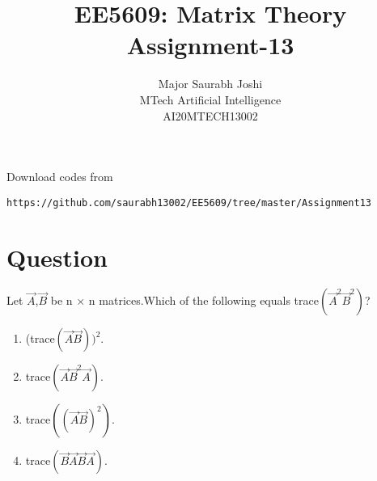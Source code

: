\documentclass[journal,12pt,onecolumn]{IEEEtran}
\begin{document}
     \def\rightbox#1{\makebox[0in][r]{#1}}
     \def\centbox#1{\makebox[0in]{#1}}
     \def\topbox#1{\raisebox{-\baselineskip}[0in][0in]{#1}}
     \def\midbox#1{\raisebox{-0.5\baselineskip}[0in][0in]{#1}}
\vspace{3cm}
\onecolumn
\title{EE5609: Matrix Theory\\
          Assignment-13\\}
\author{Major Saurabh Joshi\\MTech Artificial Intelligence\\AI20MTECH13002 }
\maketitle
\bigskip
\renewcommand{\thefigure}{\theenumi}
\renewcommand{\thetable}{\theenumi}
Download codes from 
%
\begin{lstlisting}
https://github.com/saurabh13002/EE5609/tree/master/Assignment13
\end{lstlisting}
%
 
\section{Question}
Let $\vec{A}$,$\vec{B}$ be n × n matrices.Which of the following equals trace$(\vec{A}^2 \vec{B}^2)$?\\

\begin{enumerate}
\item (trace$(\vec{A} \vec{B}))^2.$
\item trace$(\vec{A} \vec{B}^2 \vec{A}).$
\item trace$((\vec{A} \vec{B})^2).$
\item trace$(\vec{B} \vec{A} \vec{B} \vec{A}).$
\end{enumerate}
%
\end{document}

